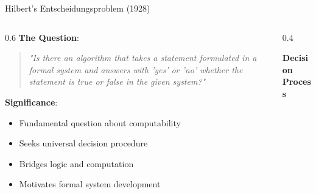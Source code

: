 \documentclass[aspectratio=169]{beamer}
\newcommand{\concept}[1]{\textbf{\color{darkblue}#1}}
\begin{document}
\begin{frame}{Hilbert's Entscheidungsproblem (1928)}
\begin{columns}
\begin{column}{0.6\textwidth}
\concept{The Question}:
\begin{quote}
\textit{"Is there an algorithm that takes a statement formulated in a formal system and answers with 'yes' or 'no' whether the statement is true or false in the given system?"}
\end{quote}

\vspace{0.3cm}
\concept{Significance}:
\begin{itemize}
\item Fundamental question about computability
\item Seeks universal decision procedure
\item Bridges logic and computation
\item Motivates formal system development
\end{itemize}
\end{column}
\begin{column}{0.4\textwidth}
\begin{center}
\textbf{Decision Process}
\vspace{0.3cm}

\end{center}
\end{column}
\end{columns}
\end{frame}
\end{document}
